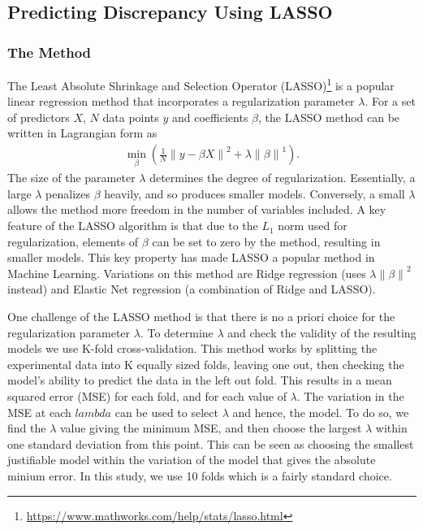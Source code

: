 \documentclass[11pt,a4paper,oneside]{article}
\newcommand{\norm}[1]{\left\lVert#1\right\rVert}
\begin{document}
{\subsection{Predicting Discrepancy Using LASSO}\label{SubSec_Lasso_Discrepancy}

\subsubsection{The Method}
The Least Absolute Shrinkage and Selection Operator (LASSO)\footnote{\url{https://www.mathworks.com/help/stats/lasso.html}} is a popular linear regression method that incorporates a regularization parameter $\lambda$. For a set of predictors $X$, $N$ data points $y$ and coefficients $\beta$, the LASSO method can be written in Lagrangian form as
\begin{align}
	\min_{\beta} ( \frac{1}{N} \norm{ y - \beta X }^2 + \lambda \norm{ \beta }^1 ).
\end{align}
The size of the parameter $\lambda$ determines the degree of regularization. Essentially, a large $\lambda$ penalizes $\beta$ heavily, and so produces smaller models. Conversely, a small $\lambda$ allows the method more freedom in the number of variables included. A key feature of the LASSO algorithm is that due to the $L_1$ norm used for regularization, elements of $\beta$ can be set to zero by the method, resulting in smaller models. This key property has made LASSO a popular method in Machine Learning. Variations on this method are Ridge regression (uses $\lambda \norm{ \beta }^2$ instead) and Elastic Net regression (a combination of Ridge and LASSO).

One challenge of the LASSO method is that there is no a priori choice for the regularization parameter $\lambda$. To determine $\lambda$ and check the validity of the resulting models we use K-fold cross-validation. This method works by splitting the experimental data into K equally sized folds, leaving one out, then checking the model's ability to predict the data in the left out fold. This results in a mean squared error (MSE) for each fold, and for each value of $\lambda$. The variation in the MSE at each $lambda$ can be used to select $\lambda$ and hence, the model. To do so, we find the $\lambda$ value giving the minimum MSE, and then choose the largest $\lambda$ within one standard deviation from this point. This can be seen as choosing the smallest justifiable  model within the variation of the model that gives the absolute minium error. In this study, we use 10 folds which is a fairly standard choice.

}
\end{document}
